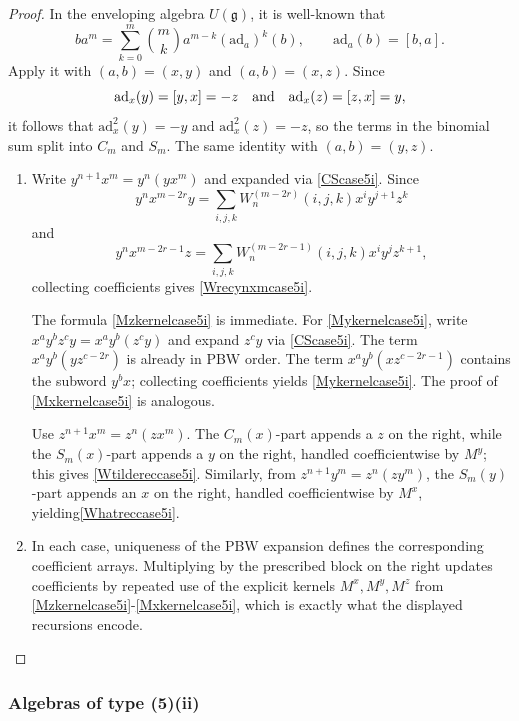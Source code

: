 \documentclass{amsart}
\theoremstyle{definition}
\theoremstyle{remark}
\numberwithin{equation}{section}
\begin{document}
\begin{proof}
In the enveloping algebra $U(\mathfrak g)$, it is well-known \cite[Lemma 2.3]{Passman1992} that
\[
b a^m=\sum_{k=0}^{m}\binom{m}{k}a^{m-k}(\mathrm{ad}_a)^k(b),
\qquad \mathrm{ad}_a(b)=[b,a].
\]
Apply it with $(a,b)=(x,y)$ and $(a,b)=(x,z)$. Since
$$
\mathrm{ad}_x(y)=[y,x]=-z \quad {\rm and} \quad \mathrm{ad}_x(z)=[z,x]=y,
$$
it follows that 
$\mathrm{ad}_x^{2}(y)=-y$ and $\mathrm{ad}_x^{2}(z)=-z$, so the terms in the binomial sum split into $C_m$ and $S_m$. The same identity with $(a,b)=(y,z)$.
\begin{enumerate}
    \item [\rm (1)] Write $y^{n+1}x^m=y^n(yx^m)$ and expanded via \eqref{CScase5i}.
Since 
\[
y^n x^{m-2r}y=\sum_{i,j,k}W^{(m-2r)}_n(i,j,k) x^i y^{j+1}z^k
\]
and
\[
y^n x^{m-2r-1}z=\sum_{i,j,k}W^{(m-2r-1)}_n(i,j,k) x^i y^{j}z^{k+1},
\]
collecting coefficients gives \eqref{Wrecynxmcase5i}.

The formula \eqref{Mzkernelcase5i} is immediate. For \eqref{Mykernelcase5i}, write $x^a y^b z^c y=x^a y^b(z^c y)$ and expand $z^c y$ via \eqref{CScase5i}.
The term $x^a y^b(y z^{c-2r})$ is already in PBW order. The term $x^a y^b(x z^{c-2r-1})$ contains the subword $y^b x$; collecting coefficients yields \eqref{Mykernelcase5i}. The proof of \eqref{Mxkernelcase5i} is analogous.

Use $z^{n+1}x^m=z^n(zx^m)$. The $C_m(x)$-part appends a $z$ on the right, while the $S_m(x)$-part appends a $y$ on the right, handled coefficientwise by $M^y$; this gives \eqref{Wtildereccase5i}. Similarly, from $z^{n+1}y^m=z^n(zy^m)$, the $S_m(y)$-part appends an $x$ on the right, handled coefficientwise by $M^x$, yielding\eqref{Whatreccase5i}.

\item [\rm (2)--(5)] In each case, uniqueness of the PBW expansion defines the corresponding coefficient arrays.
Multiplying by the prescribed block on the right updates coefficients by repeated use of the explicit kernels
$M^x,M^y,M^z$ from \eqref{Mzkernelcase5i}-\eqref{Mxkernelcase5i}, which is exactly what the displayed recursions encode.
\end{enumerate}
\end{proof}


\subsubsection{Algebras of type (5)(ii)}
\end{document}

